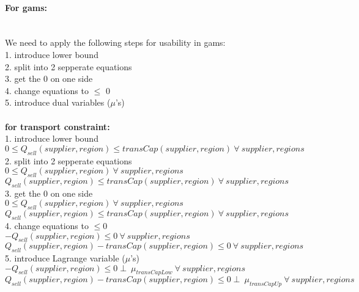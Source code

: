 \documentclass{article}
\begin{document}
\paragraph*{For gams:}
\hfill\\
We need to apply the following steps for usability in gams:\\
1. introduce lower bound\\
2. split into 2 sepperate equations\\
3. get the 0 on one side\\
4. change equations to $\leq$ 0\\
5. introduce dual variables ($\mu$'s)\\
\hfill\\
\textbf{for	transport constraint: }\\
1. introduce lower bound\\
\quad$0 \leq Q_{sell}(supplier, region) \leq transCap(supplier, region)\: \forall \: supplier,regions$\\
2. split into 2 sepperate equations\\
\quad$0 \leq Q_{sell}(supplier, region)\: \forall \: supplier,regions$\\
\quad$Q_{sell}(supplier, region) \leq transCap(supplier, region)\: \forall \: supplier,regions$\\
3. get the 0 on one side\\
\quad$0 \leq Q_{sell}(supplier, region)\: \forall \: supplier,regions$\\
\quad$Q_{sell}(supplier, region) \leq transCap(supplier, region)\: \forall \: supplier,regions$\\
4. change equations to $\leq 0$\\
\quad$ - Q_{sell}(supplier, region) \leq 0 \: \forall \: supplier,regions$\\
\quad$Q_{sell}(supplier, region) - transCap(supplier, region)\leq 0 \: \forall \: supplier,regions$\\
5. introduce Lagrange variable ($\mu$'s)\\
\quad$ - Q_{sell}(supplier, region) \leq 0  \perp\: \mu_{transCapLow} \: \forall \: supplier,regions$\\
\quad$Q_{sell}(supplier, region) - transCap(supplier, region)\leq 0  \perp\: \mu_{transCapUp} \: \forall \: supplier,regions$\\
\end{document}
